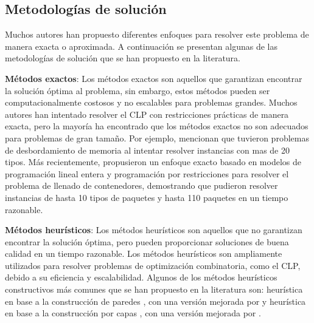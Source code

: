 \documentclass[openany]{article}
\begin{document}
\subsection{Metodologías de solución}

Muchos autores han propuesto diferentes enfoques para resolver este problema de manera exacta o aproximada. A continuación se presentan algunas de las metodologías de solución que se han propuesto en la literatura.

\textbf{Métodos exactos}: Los métodos exactos son aquellos que garantizan encontrar la solución óptima al problema, sin embargo, estos métodos pueden ser computacionalmente costosos y no escalables para problemas grandes. Muchos autores han intentado resolver el CLP con restricciones prácticas de manera exacta, pero la mayoría ha encontrado que los métodos exactos no son adecuados para problemas de gran tamaño. Por ejemplo, \textcite{JUNQUEIRA201274} mencionan que tuvieron problemas de desbordamiento de memoria al intentar resolver instancias con mas de 20 tipos. Más recientemente, \textcite{NASCIMENTO2021105186} propusieron un enfoque exacto basado en modelos de programación lineal entera y programación por restricciones para resolver el problema de llenado de contenedores, demostrando que pudieron resolver instancias de hasta 10 tipos de paquetes y hasta 110 paquetes en un tiempo razonable.

\textbf{Métodos heurísticos}: Los métodos heurísticos son aquellos que no garantizan encontrar la solución óptima, pero pueden proporcionar soluciones de buena calidad en un tiempo razonable. Los métodos heurísticos son ampliamente utilizados para resolver problemas de optimización combinatoria, como el CLP, debido a su eficiencia y escalabilidad. Algunos de los métodos heurísticos constructivos más comunes que se han propuesto en la literatura son: heurística en base a la construcción de paredes \parencite{GEORGE1980147}, con una versión mejorada por \textcite{PISINGER2002382} y heurística en base a la construcción por capas \parencite{BISCHOFF1995377}, con una versión mejorada por \textcite{RANCKJUNIOR2019471}.
\end{document}
